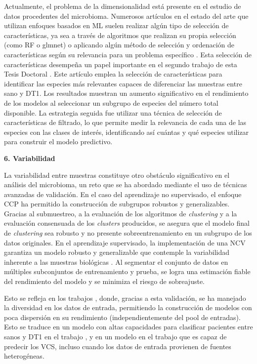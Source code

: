 Actualmente, el problema de la dimensionalidad está presente en el estudio de datos procedentes del microbioma. Numerosos artículos en el estado del arte que utilizan enfoques basados en ML suelen realizar algún tipo de selección de características, ya sea a través de algoritmos que realizan su propia selección (como RF o glmnet) o aplicando algún método de selección y ordenación de características según su relevancia para un problema específico \cite{beck2015machine, biassoni2020gut, bakir2021discovering, bakir2022inflammatory, chavarria2025using}. Esta selección de características desempeña un papel importante en el segundo trabajo de esta Tesis Doctoral \cite{paper2}. Este artículo emplea la selección de características para identificar las especies más relevantes capaces de diferenciar las muestras entre sano y DT1. Los resultados muestran un aumento significativo en el rendimiento de los modelos al seleccionar un subgrupo de especies del número total disponible. La estrategia seguida fue utilizar una técnica de selección de características de filtrado, lo que permite medir la relevancia de cada una de las especies con las clases de interés, identificando así cuántas y qué especies utilizar para construir el modelo predictivo.


\textbf{6. Variabilidad}

La variabilidad entre muestras constituye otro obstáculo significativo en el análisis del microbioma, un reto que se ha abordado mediante el uso de técnicas avanzadas de validación. En el caso del aprendizaje no supervisado, el enfoque CCP ha permitido la construcción de subgrupos robustos y generalizables. Gracias al submuestreo, a la evaluación de los algoritmos de \textit{clustering} y a la evaluación consensuada de los \textit{clusters} producidos, se asegura que el modelo final de \textit{clustering} sea robusto y no presente sobreentrenamiento en un subgrupo de los datos originales. En el aprendizaje supervisado, la implementación de una NCV garantiza un modelo robusto y generalizable que contemple la variabilidad inherente a las muestras biológicas \cite{varma2006bias}. Al segmentar el conjunto de datos en múltiples subconjuntos de entrenamiento y prueba, se logra una estimación fiable del rendimiento del modelo y se minimiza el riesgo de sobreajuste.

Esto se refleja en los trabajos \cite{paper2, paper3}, donde, gracias a esta validación, se ha manejado la diversidad en los datos de entrada, permitiendo la construcción de modelos con poca dispersión en su rendimiento (independientemente del pool de entradas). Esto se traduce en un modelo con altas capacidades para clasificar pacientes entre sanos y DT1 en el trabajo \cite{paper2}, y en un modelo en el trabajo \cite{paper3} que es capaz de predecir los VCS, incluso cuando los datos de entrada provienen de fuentes heterogéneas.

